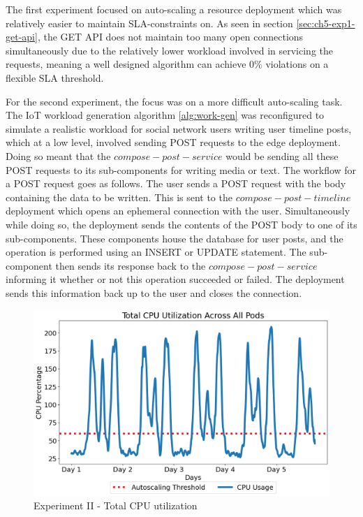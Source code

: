 The first experiment focused on auto-scaling a resource deployment which was relatively easier to maintain SLA-constraints on. As seen in section \ref{sec:ch5-exp1-get-api}, the GET API does not maintain too many open connections simultaneously due to the relatively lower workload involved in servicing the requests, meaning a well designed algorithm can achieve 0\% violations on a flexible SLA threshold. \par

For the second experiment, the focus was on a more difficult auto-scaling task. The IoT workload generation algorithm \ref{alg:work-gen} was reconfigured to simulate a realistic workload for social network users writing user timeline posts, which at a low level, involved sending POST requests to the edge deployment. Doing so meant that the $compose-post-service$ would be sending all these POST requests to its sub-components for writing media or text. The workflow for a POST request goes as follows. The user sends a POST request with the body containing the data to be written. This is sent to the $compose-post-timeline$ deployment which opens an ephemeral connection with the user. Simultaneously while doing so, the deployment sends the contents of the POST body to one of its sub-components. These components house the database for user posts, and the operation is performed using an INSERT or UPDATE statement. The sub-component then sends its response back to the $compose-post-service$ informing it whether or not this operation succeeded or failed. The deployment sends this information back up to the user and closes the connection.\par

\begin{figure}[htb]
    \centering
    \caption{Experiment II - Total CPU utilization}
    \label{fig:exp2-workload}
    \includegraphics[width=0.6\linewidth]{Figures/POST-Total-CPU.png}
\end{figure}

